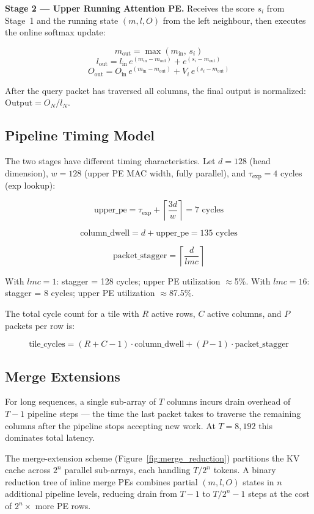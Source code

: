 \documentclass[11pt]{article}
\begin{document}
\textbf{Stage 2 --- Upper Running Attention PE.}
Receives the score \(s_i\) from Stage~1 and the running
state \((m, l, O)\) from the left neighbour, then executes
the online softmax update:

\[
m_{\text{out}} = \max(m_{\text{in}},\, s_i)
\]
\[
l_{\text{out}} = l_{\text{in}}\,e^{(m_{\text{in}} - m_{\text{out}})}
               + e^{(s_i - m_{\text{out}})}
\]
\[
O_{\text{out}} = O_{\text{in}}\,e^{(m_{\text{in}} - m_{\text{out}})}
               + V_i\,e^{(s_i - m_{\text{out}})}
\]

After the query packet has traversed all columns,
the final output is normalized:
\(\text{Output} = O_N / l_N\).

\subsection{Pipeline Timing Model}

The two stages have different timing characteristics.
Let \(d = 128\) (head dimension),
\(w = 128\) (upper PE MAC width, fully parallel), and
\(\tau_{\exp} = 4\) cycles (exp lookup):

\[
\text{upper\_pe} = \tau_{\exp} + \left\lceil \frac{3d}{w} \right\rceil = 7 \text{ cycles}
\]

\[
\text{column\_dwell} = d + \text{upper\_pe} = 135 \text{ cycles}
\]

\[
\text{packet\_stagger} = \left\lceil \frac{d}{lmc} \right\rceil
\]

With \(lmc = 1\): stagger = 128 cycles; upper PE utilization $\approx$5\%.
With \(lmc = 16\): stagger = 8 cycles; upper PE utilization $\approx$87.5\%.

The total cycle count for a tile with \(R\) active rows,
\(C\) active columns, and \(P\) packets per row is:

\[
\text{tile\_cycles}
= (R + C - 1) \cdot \text{column\_dwell}
+ (P - 1) \cdot \text{packet\_stagger}
\]

\subsection{Merge Extensions}

For long sequences, a single sub-array of \(T\) columns
incurs drain overhead of \(T - 1\) pipeline steps ---
the time the last packet takes to traverse the remaining
columns after the pipeline stops accepting new work.
At \(T = 8{,}192\) this dominates total latency.

The merge-extension scheme (Figure~\ref{fig:merge_reduction})
partitions the KV cache across \(2^n\) parallel sub-arrays,
each handling \(T / 2^n\) tokens.
A binary reduction tree of inline merge PEs combines
partial \((m, l, O)\) states in \(n\) additional pipeline
levels, reducing drain from \(T - 1\) to \(T / 2^n - 1\)
steps at the cost of \(2^n\times\) more PE rows.
\end{document}

